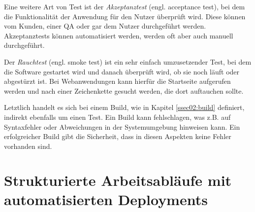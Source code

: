 Eine weitere Art von Test ist der \emph{Akzeptanztest} (engl. acceptance test), bei dem die Funktionalität der Anwendung für den Nutzer überprüft wird. Diese können vom Kunden, einer \ac{QA} oder gar dem Nutzer durchgeführt werden. Akzeptanztests können automatisiert werden, werden oft aber auch manuell durchgeführt.

Der \emph{Rauchtest} (engl. smoke test) ist ein sehr einfach umzusetzender Test, bei dem die Software gestartet wird und danach überprüft wird, ob sie noch läuft oder abgestürzt ist. Bei Webanwendungen kann hierfür die Startseite aufgerufen werden und nach einer Zeichenkette gesucht werden, die dort auftauchen sollte.

Letztlich handelt es sich bei einem Build, wie in Kapitel \ref{ssec02:build} definiert, indirekt ebenfalls um einen Test. Ein Build kann fehlschlagen, was z.B. auf Syntaxfehler oder Abweichungen in der Systemumgebung hinweisen kann. Ein erfolgreicher Build gibt die Sicherheit, dass in diesen Aspekten keine Fehler vorhanden sind.


\section{Strukturierte Arbeitsabläufe mit automatisierten Deployments}

